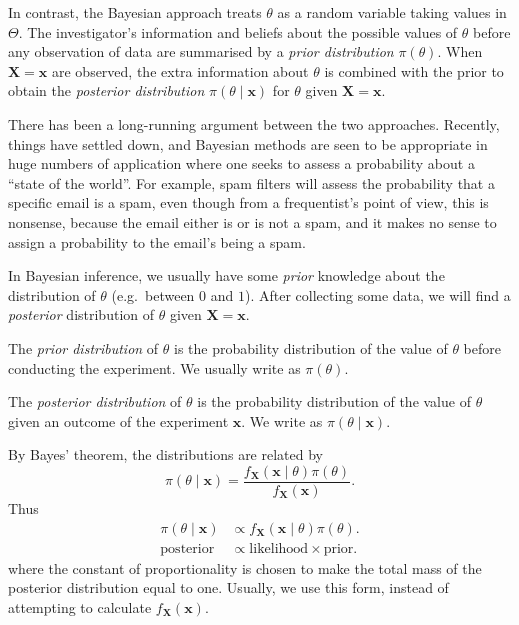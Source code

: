 \documentclass[a4paper]{article}
\begin{document}
In contrast, the Bayesian approach treats $\theta$ as a random variable taking values in $\Theta$. The investigator's information and beliefs about the possible values of $\theta$ before any observation of data are summarised by a \emph{prior distribution} $\pi(\theta)$. When $\mathbf{X} = \mathbf{x}$ are observed, the extra information about $\theta$ is combined with the prior to obtain the \emph{posterior distribution} $\pi(\theta\mid \mathbf{x})$ for $\theta$ given $\mathbf{X} = \mathbf{x}$.

There has been a long-running argument between the two approaches. Recently, things have settled down, and Bayesian methods are seen to be appropriate in huge numbers of application where one seeks to assess a probability about a ``state of the world''. For example, spam filters will assess the probability that a specific email is a spam, even though from a frequentist's point of view, this is nonsense, because the email either is or is not a spam, and it makes no sense to assign a probability to the email's being a spam.

In Bayesian inference, we usually have some \emph{prior} knowledge about the distribution of $\theta$ (e.g.\ between $0$ and $1$). After collecting some data, we will find a \emph{posterior} distribution of $\theta$ given $\mathbf{X} = \mathbf{x}$.

\begin{defi}
  The \emph{prior distribution} of $\theta$ is the probability distribution of the value of $\theta$ before conducting the experiment. We usually write as $\pi(\theta)$.

  The \emph{posterior distribution} of $\theta$ is the probability distribution of the value of $\theta$ given an outcome of the experiment $\mathbf{x}$. We write as $\pi(\theta\mid \mathbf{x})$.
\end{defi}
By Bayes' theorem, the distributions are related by
\[
  \pi(\theta\mid \mathbf{x}) = \frac{f_{\mathbf{X}}(\mathbf{x}\mid \theta)\pi(\theta)}{f_{\mathbf{X}}(\mathbf{x})}.
\]
Thus
\begin{align*}
  \pi(\theta\mid \mathbf{x}) &\propto f_{\mathbf{X}}(\mathbf{x}\mid \theta)\pi(\theta).\\
  \text{posterior} &\propto \text{likelihood}\times\text{prior}.
\end{align*}
where the constant of proportionality is chosen to make the total mass of the posterior distribution equal to one. Usually, we use this form, instead of attempting to calculate $f_\mathbf{X}(\mathbf{x})$.
\end{document}

